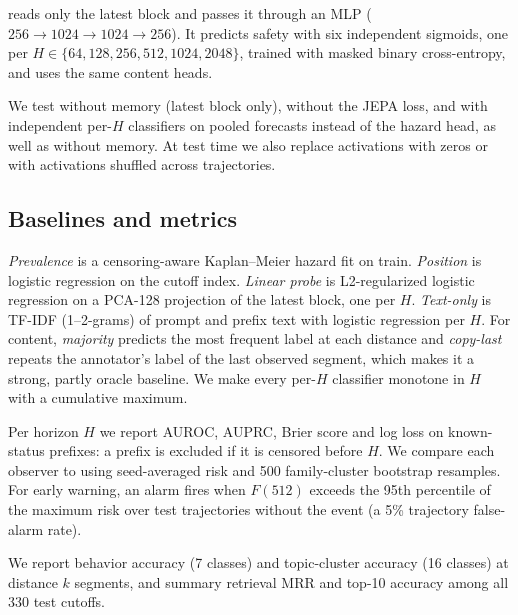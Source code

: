 \directao reads only the latest block and passes it through an MLP ($256 \to 1024 \to 1024 \to 256$).
It predicts safety with six independent sigmoids, one per $H \in \{64,128,256,512,1024,2048\}$, trained with masked binary cross-entropy, and uses the same content heads.

We test \hq without memory (latest block only), without the JEPA loss, and with independent per-$H$ classifiers on pooled forecasts instead of the hazard head, as well as \roll without memory.
At test time we also replace activations with zeros or with activations shuffled across trajectories.

\subsection{Baselines and metrics}
\label{sec:metrics}

\emph{Prevalence} is a censoring-aware Kaplan--Meier hazard fit on train.
\emph{Position} is logistic regression on the cutoff index.
\emph{Linear probe} is L2-regularized logistic regression on a PCA-128 projection of the latest block, one per $H$.
\emph{Text-only} is TF-IDF (1--2-grams) of prompt and prefix text with logistic regression per $H$.
For content, \emph{majority} predicts the most frequent label at each distance and \emph{copy-last} repeats the annotator's label of the last observed segment, which makes it a strong, partly oracle baseline.
We make every per-$H$ classifier monotone in $H$ with a cumulative maximum.

Per horizon $H$ we report AUROC, AUPRC, Brier score and log loss on known-status prefixes: a prefix is excluded if it is censored before $H$.
We compare each observer to \directao using seed-averaged risk and 500 family-cluster bootstrap resamples.
For early warning, an alarm fires when $F(512)$ exceeds the 95th percentile of the maximum risk over test trajectories without the event (a 5\% trajectory false-alarm rate).

We report behavior accuracy (7 classes) and topic-cluster accuracy (16 classes) at distance $k$ segments, and summary retrieval MRR and top-10 accuracy among all 330 test cutoffs.

